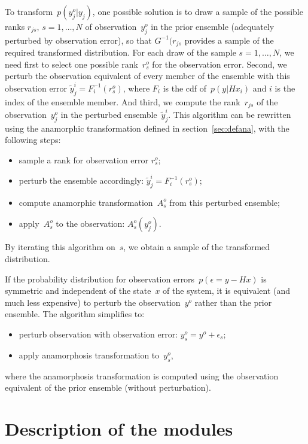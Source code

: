 \documentclass[11pt]{article}
\begin{document}
To transform~$p(y^o_j|y_j)$, one possible solution is to draw a sample
of the possible ranks $r_{js},\,s=1,\ldots,N$ of observation~$y^o_j$
in the prior ensemble (adequately perturbed by observation error),
so that $G^{-1}(r_{js}$ provides a sample of the required transformed distribution.
For each draw of the sample $s=1,\ldots,N$, we need first to select
one possible rank~$r^o_s$ for the observation error.
Second, we perturb the observation equivalent of every member of the ensemble
with this observation error $\tilde{y}_j^i = F^{-1}_i(r_s^o)$,
where $F_i$ is the cdf of~$p(y|Hx_i)$ and $i$ is the index of the ensemble member.
And third, we compute the rank~$r_{js}$ of the observation~$y^o_j$
in the perturbed ensemble~$\tilde{y}_j^i$.
This algorithm can be rewritten using the anamorphic transformation
defined in section~\ref{sec:defana}, with the following steps:

\begin{itemize}
\item sample a rank for observation error $r^o_s$;
\item perturb the ensemble accordingly: $\tilde{y}_j ^i = F^{-1}_i(r_s^o)$;
\item compute anamorphic transformation~$A_s^o$ from this perturbed ensemble;
\item apply~$A_s^o$ to the observation: $A_s^o(y^o_j)$.
\end{itemize}

\noindent
By iterating this algorithm on~$s$, we obtain a sample of the transformed distribution.

If the probability distribution for observation errors~$p(\epsilon = y-Hx)$
is symmetric and independent of the state~$x$ of the system,
it is equivalent (and much less expensive) to perturb the observation~$y^o$
rather than the prior ensemble.
The algorithm simplifies to:

\begin{itemize}
\item perturb observation with observation error: $y^o_s = y^o + \epsilon_s$;
\item apply anamorphosis transformation to~$y^o_s$,
\end{itemize}

\noindent
where the anamorphosis transformation is computed using the observation equivalent
of the prior ensemble (without perturbation).

\section{Description of the modules}
\end{document}
